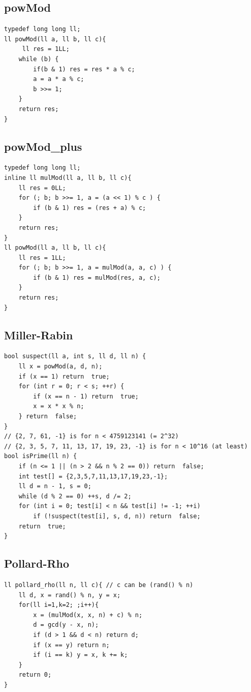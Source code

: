 \documentclass[twocolumn]{article}
\begin{document}
\begin{twocolumn}
\subsection{powMod}
\begin{lstlisting}[language={[ANSI]C}]
typedef long long ll;
ll powMod(ll a, ll b, ll c){
	 ll res = 1LL;
	while (b) {
		if(b & 1) res = res * a % c;
		a = a * a % c;
		b >>= 1;
	}
	return res;
}
\end{lstlisting}

\subsection{powMod\_plus}
\begin{lstlisting}[language={[ANSI]C}]
typedef long long ll;
inline ll mulMod(ll a, ll b, ll c){
	ll res = 0LL;
	for (; b; b >>= 1, a = (a << 1) % c ) {
		if (b & 1) res = (res + a) % c;
	}
	return res;
}
ll powMod(ll a, ll b, ll c){
	ll res = 1LL;
	for (; b; b >>= 1, a = mulMod(a, a, c) ) {
		if (b & 1) res = mulMod(res, a, c);
	}
	return res;
}
\end{lstlisting}

\subsection{Miller-Rabin}
\begin{lstlisting}[language={[ANSI]C}]
bool suspect(ll a, int s, ll d, ll n) {
	ll x = powMod(a, d, n);
	if (x == 1) return  true;
	for (int r = 0; r < s; ++r) {
		if (x == n - 1) return  true;
		x = x * x % n;
	} return  false;
}
// {2, 7, 61, -1} is for n < 4759123141 (= 2^32)
// {2, 3, 5, 7, 11, 13, 17, 19, 23, -1} is for n < 10^16 (at least)
bool isPrime(ll n) {
	if (n <= 1 || (n > 2 && n % 2 == 0)) return  false;
	int test[] = {2,3,5,7,11,13,17,19,23,-1};
	ll d = n - 1, s = 0;
	while (d % 2 == 0) ++s, d /= 2;
	for (int i = 0; test[i] < n && test[i] != -1; ++i)
		if (!suspect(test[i], s, d, n)) return  false;
	return  true;
}
\end{lstlisting}

\subsection{Pollard-Rho}
\begin{lstlisting}[language={[ANSI]C}]
ll pollard_rho(ll n, ll c){ // c can be (rand() % n)
	ll d, x = rand() % n, y = x;
	for(ll i=1,k=2; ;i++){
		x = (mulMod(x, x, n) + c) % n;
		d = gcd(y - x, n);
		if (d > 1 && d < n) return d;
		if (x == y) return n;
		if (i == k) y = x, k += k;
	}
	return 0;
}
\end{lstlisting}


\end{twocolumn}
\end{document}
